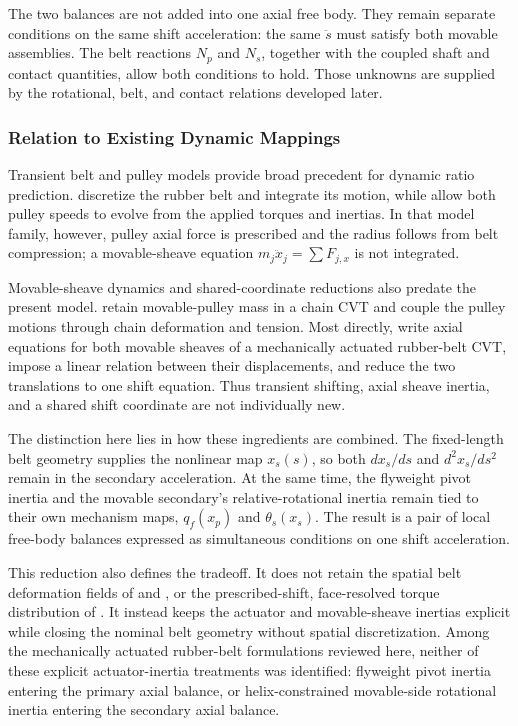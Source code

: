 \documentclass[11pt]{report}
\numberwithin{equation}{section}
\begin{document}
The two balances are not added into one axial free body. They remain separate
conditions on the same shift acceleration: the same \(\ddot s\) must satisfy
both movable assemblies. The belt reactions \(N_p\) and \(N_s\), together with
the coupled shaft and contact quantities, allow both conditions to hold. Those
unknowns are supplied by the rotational, belt, and contact relations developed
later.

\subsubsection{Relation to Existing Dynamic Mappings}
\label{sec:relation_to_existing_dynamic_mappings}

Transient belt and pulley models provide broad precedent for dynamic ratio
prediction. \citet{JulioPlante2011} discretize the rubber belt and integrate its
motion, while \citet{Ballew2015} allow both pulley speeds to evolve from the
applied torques and inertias. In that model family, however, pulley axial force
is prescribed and the radius follows from belt compression; a movable-sheave
equation \(m_j\ddot x_j=\sum F_{j,x}\) is not integrated.

Movable-sheave dynamics and shared-coordinate reductions also predate the
present model. \citet{DuanEtAl2016} retain movable-pulley mass in a chain CVT
and couple the pulley motions through chain deformation and tension. Most
directly, \citet{SilvaEtAl2023} write axial equations for both movable sheaves
of a mechanically actuated rubber-belt CVT, impose a linear relation between
their displacements, and reduce the two translations to one shift equation.
Thus transient shifting, axial sheave inertia, and a shared shift coordinate
are not individually new.

The distinction here lies in how these ingredients are combined. The
fixed-length belt geometry supplies the nonlinear map \(x_s(s)\), so both
\(dx_s/ds\) and \(d^2x_s/ds^2\) remain in the secondary acceleration. At the
same time, the flyweight pivot inertia and the movable secondary's
relative-rotational inertia remain tied to their own mechanism maps,
\(q_f(x_p)\) and \(\theta_s(x_s)\). The result is a pair of local free-body
balances expressed as simultaneous conditions on one shift acceleration.

This reduction also defines the tradeoff. It does not retain the spatial belt
deformation fields of \citet{JulioPlante2011} and \citet{Ballew2015}, or the
prescribed-shift, face-resolved torque distribution of
\citet{SorgeCammalleri2011}. It instead keeps the actuator and movable-sheave
inertias explicit while closing the nominal belt geometry without spatial
discretization. Among the mechanically actuated rubber-belt formulations
reviewed here, neither of these explicit actuator-inertia treatments was
identified: flyweight pivot inertia entering the primary axial balance, or
helix-constrained movable-side rotational inertia entering the secondary axial
balance.
\end{document}
